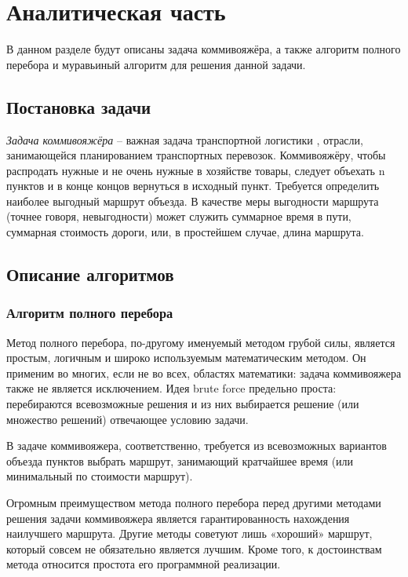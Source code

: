 \chapter{Аналитическая часть}
В данном разделе будут описаны задача коммивояжёра, а также алгоритм полного перебора и муравьиный алгоритм для решения данной задачи.


\section{Постановка задачи}
\textit{Задача коммивояжёра} -- важная задача транспортной логистики \cite{com},
отрасли, занимающейся планированием транспортных перевозок.
Коммивояжёру, чтобы распродать нужные и не очень нужные в хозяйстве товары,
следует объехать n пунктов и в конце концов вернуться в исходный пункт.
Требуется определить наиболее выгодный маршрут объезда.
В качестве меры выгодности маршрута (точнее говоря, невыгодности)
может служить суммарное время в пути, суммарная стоимость дороги, или,
в простейшем случае, длина маршрута.



\section{Описание алгоритмов}

\subsection{Алгоритм полного перебора}

Метод полного перебора, по-другому именуемый методом грубой силы, является простым, логичным и широко используемым
математическим методом. Он применим во многих, если не во всех,
областях математики: задача коммивояжера также не является исключением.
Идея brute force предельно проста: перебираются всевозможные
решения и из них выбирается решение (или множество решений) отвечающее
условию задачи.

В задаче коммивояжера, соответственно, требуется из всевозможных
вариантов объезда пунктов выбрать маршрут, занимающий кратчайшее время
(или минимальный по стоимости маршрут).

Огромным преимуществом метода полного перебора перед другими
методами решения задачи коммивояжера является гарантированность
нахождения наилучшего маршрута. Другие методы советуют лишь
«хороший» маршрут, который совсем не обязательно является лучшим. Кроме
того, к достоинствам метода относится простота его программной реализации.


